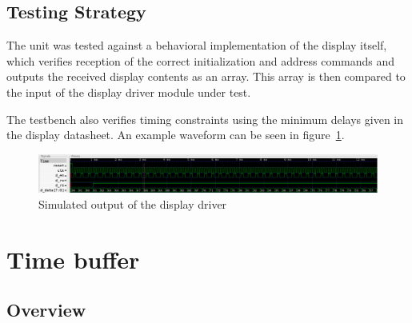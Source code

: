 \documentclass[a4paper]{article}
\begin{document}
\subsection{Testing Strategy}

The unit was tested against a behavioral implementation of the display itself,
which verifies reception of the correct initialization and address commands and
outputs the received display contents as an array. This array is then compared
to the input of the display driver module under test.

The testbench also verifies timing constraints using the minimum delays given
in the display datasheet. An example waveform can be seen in
figure~\ref{display_driver_waveform}.

\begin{figure}
	\begin{center}
		\includegraphics[width=\textwidth]{display_driver_timing_reset.png}
	\end{center}
	\caption{Simulated output of the display driver}
	\label{display_driver_waveform}
\end{figure}

\section{Time buffer}

\subsection{Overview}
\end{document}
